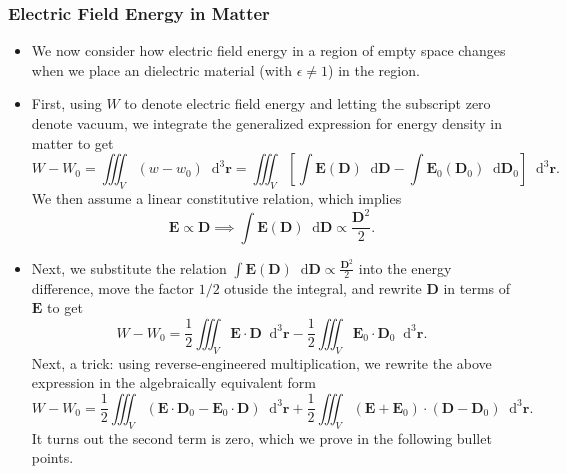 \documentclass[11pt, a4paper]{article}
\newcommand{\diff}{\mathop{}\!\mathrm{d}} %
\newcommand{\dr}{\diff^{3} \r}  %
\renewcommand{\vec}[1]{\bm{#1}} %
\renewcommand{\r}{\vec{r}}
\newcommand{\E}{\vec{E}} %
\newcommand{\D}{\vec{D}}  %
\begin{document}
\subsubsection{Electric Field Energy in Matter}
\begin{itemize}
    \item We now consider how electric field energy in a region of empty space changes when we place an dielectric material (with $ \epsilon \neq 1 $) in the region.
	
	\item First, using $ W $ to denote electric field energy and letting the subscript zero denote vacuum, we integrate the generalized expression for energy density in matter to get
	\begin{equation*}
        W - W_{0} = \iiint_{V}(w - w_{0})\dr = \iiint_{V} \left[\int \E(\D) \diff \D - \int \E_{0}(\D_{0}) \diff \D_{0} \right] \dr.
	\end{equation*}
	We then assume a linear constitutive relation, which implies
	\begin{equation*}
		\E \propto \D \implies \int \E(\D) \diff \D \propto \frac{\D^{2}}{2}.
	\end{equation*}

    \item Next, we substitute the relation $ \int \E(\D) \diff \D \propto \frac{\D^{2}}{2} $ into the energy difference, move the factor $ 1/2 $ otuside the integral, and rewrite $ \D $ in terms of $ \E $ to get
	\begin{equation*}
		W - W_{0} = \frac{1}{2}\iiint_{V} \E \cdot \D \dr - \frac{1}{2}\iiint_{V}\E_{0}\cdot \D_{0}\dr.
	\end{equation*}
	Next, a trick: using reverse-engineered multiplication, we rewrite the above expression in the algebraically equivalent form
	\begin{equation*}
		W - W_{0} = \frac{1}{2}\iiint_{V}(\E \cdot \D_{0} - \E_{0}\cdot\D)\dr + \frac{1}{2}\iiint_{V}(\E + \E_{0})\cdot (\D - \D_{0})\dr.
	\end{equation*}
    It turns out the second term is zero, which we prove in the following bullet points.


\end{itemize}
\end{document}
